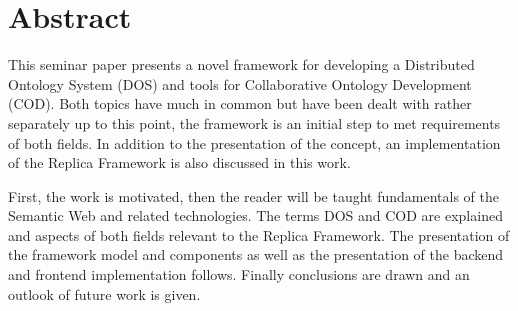 \chapter*{Abstract}
\label{abstract}
This seminar paper presents a novel framework for developing a Distributed
Ontology System (DOS) and tools for Collaborative Ontology Development (COD).
Both topics have much in common but have been dealt with rather separately
up to this point, the framework is an initial step to met requirements of
both fields.
In addition to the presentation of the concept, an implementation of the
Replica Framework is also discussed in this work.

First, the work is motivated, then the reader will be taught
fundamentals of the Semantic Web and related technologies. The terms
DOS and COD are explained and aspects of both fields relevant to the Replica Framework.
The presentation of the framework model and components as well
as the presentation of the backend and frontend implementation follows.
Finally conclusions are drawn and an outlook of future work is given.

\clearpage

